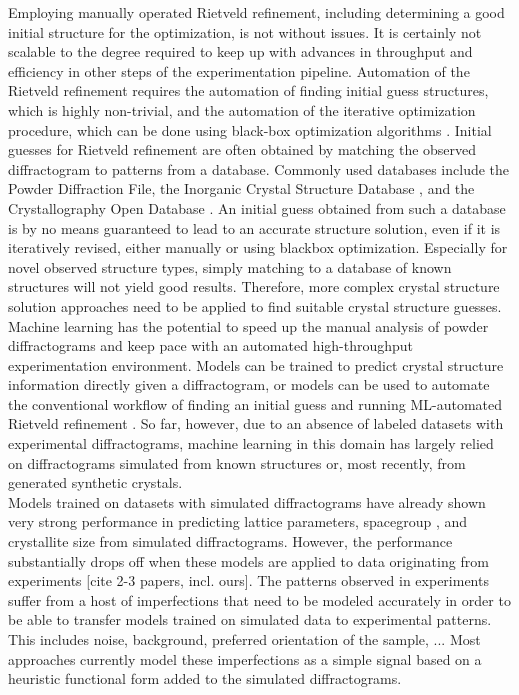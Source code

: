 Employing manually operated Rietveld refinement, including determining a good initial structure for the optimization, is not without issues.
It is certainly not scalable to the degree required to keep up with advances in throughput and efficiency in other steps of the experimentation pipeline.
Automation of the Rietveld refinement requires the automation of finding initial guess structures, which is highly non-trivial, and the automation of the iterative optimization procedure, which can be done using black-box optimization algorithms \cite{Ozaki2020}. 
Initial guesses for Rietveld refinement are often obtained by matching the observed diffractogram to patterns from a database. Commonly used databases include the Powder Diffraction File\cite{GatesRector2019}, the Inorganic Crystal Structure Database \cite{Belsky2002}, and the Crystallography Open Database \cite{Grazulis2009}. An initial guess obtained from such a database is by no means guaranteed to lead to an accurate structure solution, even if it is iteratively revised, either manually or using blackbox optimization.\cite{Ozaki2020} Especially for novel observed structure types, simply matching to a database of known structures will not yield good results. Therefore, more complex crystal structure solution approaches need to be applied to find suitable crystal structure guesses. \\


Machine learning has the potential to speed up the manual analysis of powder diffractograms and keep pace with an automated high-throughput experimentation environment. \cite{Agrawal2019, Surdu2023}
Models can be trained to predict crystal structure information directly given a diffractogram, or models can be used to automate the conventional workflow of finding an initial guess \cite{Surdu2023} and running ML-automated Rietveld refinement \cite{Feng2019}.
So far, however, due to an absence of labeled datasets with experimental diffractograms\cite{Wang2020}, machine learning in this domain has largely relied on diffractograms simulated from known structures\cite{Park2017, Lee2023} or, most recently, from generated synthetic crystals. \cite{Schopmans2023} \\

Models trained on datasets with simulated diffractograms have already shown very strong performance in predicting lattice parameters\cite{Dong2021, Chitturi2021, Habershon2004}, spacegroup \cite{Schopmans2023, Oviedo2018, Park2017, Vecsei2018, Zaloga2020, Suzuki2020, Chakraborty2021}, and crystallite size \cite{Dong2021, Chakraborty2021} from simulated diffractograms.
However, the performance substantially drops off when these models are applied to data originating from experiments \cite{Schopmans2023}[cite 2-3 papers, incl. ours].
The patterns observed in experiments suffer from a host of imperfections that need to be modeled accurately in order to be able to transfer models trained on simulated data to experimental patterns. This includes noise, background, preferred orientation of the sample, ...
Most approaches currently model these imperfections as a simple signal based on a heuristic functional form added to the simulated diffractograms.

